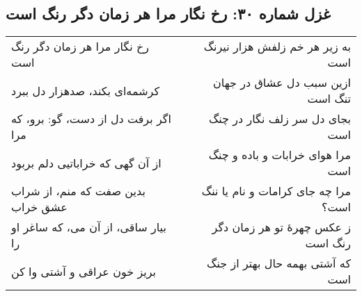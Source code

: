 \begin{center}
\section*{غزل شماره ۳۰: رخ نگار مرا هر زمان دگر رنگ است}
\label{sec:030}
\begin{longtable}{l p{0.5cm} r}
رخ نگار مرا هر زمان دگر رنگ است
&&
به زیر هر خم زلفش هزار نیرنگ است
\\
کرشمه‌ای بکند، صدهزار دل ببرد
&&
ازین سبب دل عشاق در جهان تنگ است
\\
اگر برفت دل از دست، گو: برو، که مرا
&&
بجای دل سر زلف نگار در چنگ است
\\
از آن گهی که خراباتیی دلم بربود
&&
مرا هوای خرابات و باده و چنگ است
\\
بدین صفت که منم، از شراب عشق خراب
&&
مرا چه جای کرامات و نام یا ننگ است؟
\\
بیار ساقی، از آن می، که ساغر او را
&&
ز عکس چهرهٔ تو هر زمان دگر رنگ است
\\
بریز خون عراقی و آشتی وا کن
&&
که آشتی بهمه حال بهتر از جنگ است
\\
\end{longtable}
\end{center}
